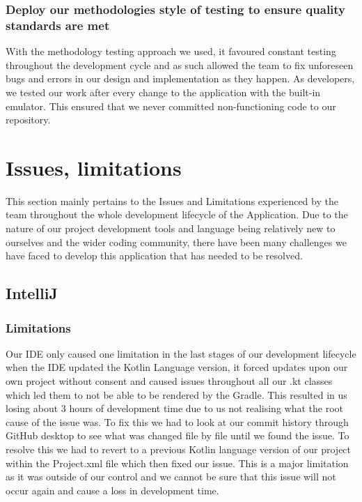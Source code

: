 \subsubsection {Deploy our methodologies style of testing to ensure quality \newline standards are met}
With the methodology testing approach we used, it favoured constant testing throughout the development cycle and as such allowed the team to fix unforeseen bugs and errors in our design and implementation as they happen. As developers, we tested our work after every change to the application with the built-in emulator. This ensured that we never committed non-functioning code to our repository.
\newpage
\section{Issues, limitations}
This section mainly pertains to the Issues and Limitations experienced by the team throughout the whole development lifecycle of the Application. Due to the nature of our project development tools and language being relatively new to ourselves and the wider coding community, there have been many challenges we have faced to develop this application that has needed to be resolved.
\subsection{IntelliJ}
\subsubsection{Limitations}
Our IDE only caused one limitation in the last stages of our development lifecycle when the IDE updated the Kotlin Language version, it forced \newline updates upon our own project without consent and caused issues throughout all our .kt classes which led them to not be able to be rendered by the Gradle.
\newline
\newline
This resulted in us losing about 3 hours of development time due to us not realising what the root cause of the issue was. To fix this we had to look at our commit history through GitHub desktop to see what was changed file by file until we found the issue.
\newline
\newline
To resolve this we had to revert to a previous Kotlin language version of our project within the Project.xml file which then fixed our issue. This is a major limitation as it was outside of our control and we cannot be sure that this issue will not occur again and cause a loss in development time.

